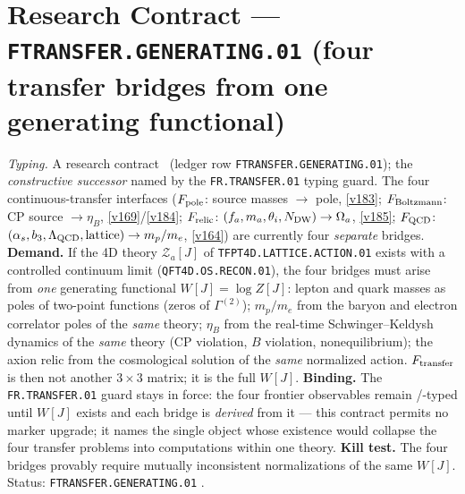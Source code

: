 \documentclass[11pt,a4paper]{article}
\begin{document}
\section*{Research Contract --- \texttt{FTRANSFER.GENERATING.01} (four transfer bridges from one generating functional)}
\noindent\emph{Typing.} A research contract \mO\ (ledger row \texttt{FTRANSFER.GENERATING.01});
the \emph{constructive successor} named by the \texttt{FR.TRANSFER.01} typing guard.  The four
continuous-transfer interfaces ($F_{\rm pole}$: source masses $\to$ pole, \vref{v183};
$F_{\rm Boltzmann}$: CP source $\to\eta_B$, \vref{v169}/\vref{v184}; $F_{\rm relic}$:
$(f_a,m_a,\theta_i,N_{\rm DW})\to\Omega_a$, \vref{v185}; $F_{\rm QCD}$:
$(\alpha_s,b_3,\Lambda_{\rm QCD},\text{lattice})\to m_p/m_e$, \vref{v164}) are currently four
\emph{separate} bridges.  \textbf{Demand.}  If the 4D theory $\mathcal Z_a[J]$ of
\texttt{TFPT4D.LATTICE.ACTION.01} exists with a controlled continuum limit
(\texttt{QFT4D.OS.RECON.01}), the four bridges must arise from \emph{one} generating functional
$W[J]=\log Z[J]$: lepton and quark masses as poles of two-point functions (zeros of
$\Gamma^{(2)}$); $m_p/m_e$ from the baryon and electron correlator poles of the \emph{same}
theory; $\eta_B$ from the real-time Schwinger--Keldysh dynamics of the \emph{same} theory (CP
violation, $B$ violation, nonequilibrium); the axion relic from the cosmological solution of
the \emph{same} normalized action.  $F_{\rm transfer}$ is then not another $3\times3$ matrix;
it is the full $W[J]$.  \textbf{Binding.}  The \texttt{FR.TRANSFER.01} guard stays in force:
the four frontier observables remain \mC/\mO-typed until $W[J]$ exists and each bridge is
\emph{derived} from it --- this contract permits no marker upgrade; it names the single object
whose existence would collapse the four transfer problems into computations within one theory.
\textbf{Kill test.}  The four bridges provably require mutually inconsistent normalizations of
the same $W[J]$.  Status: \texttt{FTRANSFER.GENERATING.01} \mO.

\end{document}
